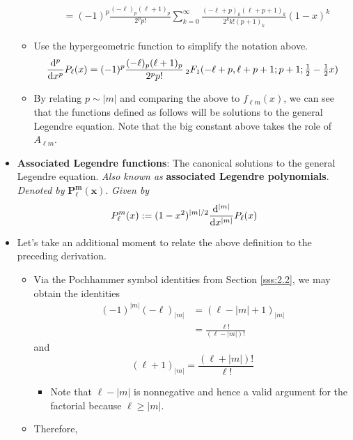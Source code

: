 \documentclass[../finalProject.tex]{subfiles}
\begin{document}
\begin{itemize}
\begin{itemize}
\begin{align*}
            &= (-1)^p\frac{(-\ell)_p(\ell+1)_p}{2^pp!}\sum_{k=0}^\infty\frac{(-\ell+p)_k(\ell+p+1)_k}{2^kk!(p+1)_k}(1-x)^k
        \end{align*}
        \item Use the hypergeometric function to simplify the notation above.
        \begin{equation*}
            \dv[p]{x}P_\ell(x) = (-1)^p\frac{(-\ell)_p(\ell+1)_p}{2^pp!}\,{}_2F_1(-\ell+p,\ell+p+1;p+1;\tfrac{1}{2}-\tfrac{1}{2}x)
        \end{equation*}
        \item By relating $p\sim|m|$ and comparing the above to $f_{\ell m}(x)$, we can see that the functions defined as follows will be solutions to the general Legendre equation. Note that the big constant above takes the role of $A_{\ell m}$.
    \end{itemize}
    \item \textbf{Associated Legendre functions}: The canonical solutions to the general Legendre equation. \emph{Also known as} \textbf{associated Legendre polynomials}. \emph{Denoted by} $\bm{P_\ell^m(x)}$. \emph{Given by}
    \begin{equation*}
        P_\ell^m(x) := (1-x^2)^{|m|/2}\dv[|m|]{x}P_\ell(x)
    \end{equation*}
    \item Let's take an additional moment to relate the above definition to the preceding derivation.
    \begin{itemize}
        \item Via the Pochhammer symbol identities from Section \ref{sss:2.2}, we may obtain the identities
        \begin{align*}
            (-1)^{|m|}(-\ell)_{|m|} &= (\ell-|m|+1)_{|m|}\tag*{Identity 2}\\
            &= \frac{\ell!}{(\ell-|m|)!}\tag*{Identity 2}
        \end{align*}
        and
        \begin{equation*}
            (\ell+1)_{|m|} = \frac{(\ell+|m|)!}{\ell!}\tag*{Identity 3}
        \end{equation*}
        \begin{itemize}
            \item Note that $\ell-|m|$ is nonnegative and hence a valid argument for the factorial because $\ell\geq|m|$.
        \end{itemize}
        \item Therefore,
        \begin{align*}

\end{align*}
\end{itemize}
\end{itemize}
\end{document}
